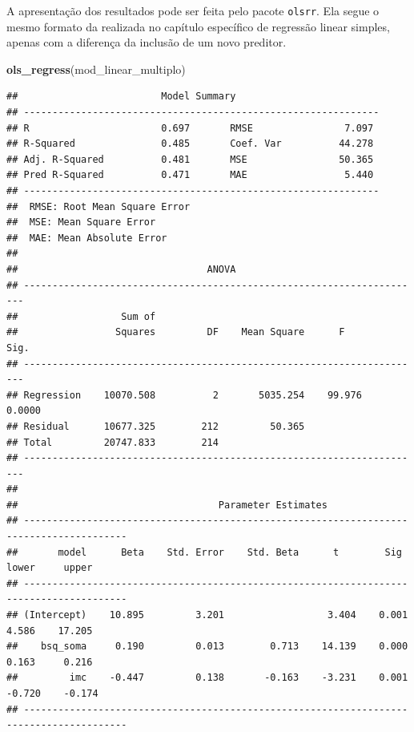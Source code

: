 \documentclass[
]{book}
\newenvironment{Shaded}{\begin{snugshade}}{\end{snugshade}}
\newcommand{\KeywordTok}[1]{\textcolor[rgb]{0.13,0.29,0.53}{\textbf{#1}}}
\newcommand{\NormalTok}[1]{#1}
\begin{document}
A apresentação dos resultados pode ser feita pelo pacote \texttt{olsrr}. Ela segue o mesmo formato da realizada no capítulo específico de regressão linear simples, apenas com a diferença da inclusão de um novo preditor.

\begin{Shaded}
\begin{Highlighting}[]
\KeywordTok{ols_regress}\NormalTok{(mod_linear_multiplo)}
\end{Highlighting}
\end{Shaded}

\begin{verbatim}
##                         Model Summary                          
## --------------------------------------------------------------
## R                       0.697       RMSE                7.097 
## R-Squared               0.485       Coef. Var          44.278 
## Adj. R-Squared          0.481       MSE                50.365 
## Pred R-Squared          0.471       MAE                 5.440 
## --------------------------------------------------------------
##  RMSE: Root Mean Square Error 
##  MSE: Mean Square Error 
##  MAE: Mean Absolute Error 
## 
##                                 ANOVA                                  
## ----------------------------------------------------------------------
##                  Sum of                                               
##                 Squares         DF    Mean Square      F         Sig. 
## ----------------------------------------------------------------------
## Regression    10070.508          2       5035.254    99.976    0.0000 
## Residual      10677.325        212         50.365                     
## Total         20747.833        214                                    
## ----------------------------------------------------------------------
## 
##                                   Parameter Estimates                                    
## ----------------------------------------------------------------------------------------
##       model      Beta    Std. Error    Std. Beta      t        Sig      lower     upper 
## ----------------------------------------------------------------------------------------
## (Intercept)    10.895         3.201                  3.404    0.001     4.586    17.205 
##    bsq_soma     0.190         0.013        0.713    14.139    0.000     0.163     0.216 
##         imc    -0.447         0.138       -0.163    -3.231    0.001    -0.720    -0.174 
## ----------------------------------------------------------------------------------------
\end{verbatim}
\end{document}

